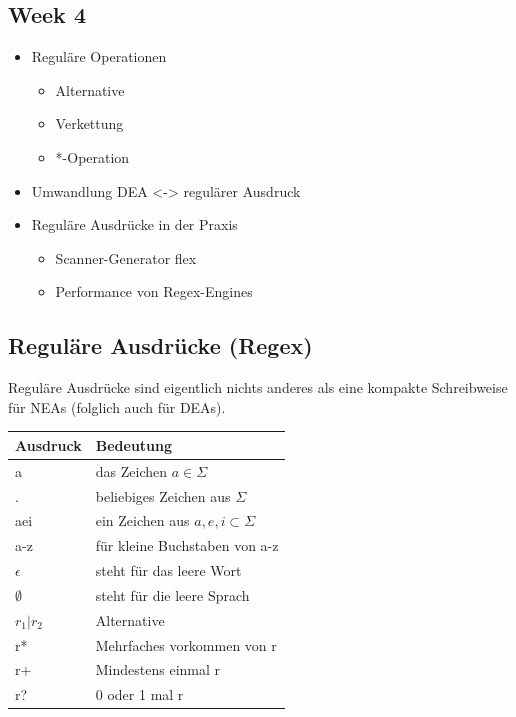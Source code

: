 \documentclass[11pt,twoside,landscape]{article}
\begin{document}
\begin{multicols}{3}
\section{Week 4}
\label{sec:org0ac53a5}
\begin{itemize}
\item Reguläre Operationen
\begin{itemize}
\item Alternative
\item Verkettung
\item *-Operation
\end{itemize}
\item Umwandlung DEA <-> regulärer Ausdruck
\item Reguläre Ausdrücke in der Praxis
\begin{itemize}
\item Scanner-Generator flex
\item Performance von Regex-Engines
\end{itemize}
\end{itemize}


\subsection{Reguläre Ausdrücke (Regex)}
\label{sec:org32ae985}
Reguläre Ausdrücke sind eigentlich nichts anderes als eine kompakte Schreibweise für NEAs (folglich auch für DEAs).
\begin{center}
\begin{tabular}{ll}
Ausdruck & Bedeutung\\
\hline
a & das Zeichen \(a \in \Sigma\)\\
. & beliebiges Zeichen aus \(\Sigma\)\\
aei & ein Zeichen aus \({a, e, i} \subset \Sigma\)\\
a-z & für kleine Buchstaben von a-z\\
\(\epsilon\) & steht für das leere Wort\\
\(\emptyset\) & steht für die leere Sprach\\
\(r_{1}\vert r_{2}\) & Alternative\\
r* & Mehrfaches vorkommen von r\\
r+ & Mindestens einmal r\\
r? & 0 oder 1 mal r\\
\end{tabular}
\end{center}



\end{multicols}
\end{document}
